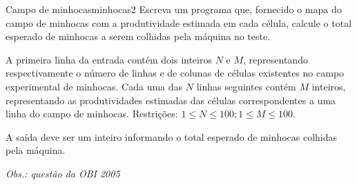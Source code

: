 \documentclass[12pt,a4paper,oneside]{article}
\begin{document}
\begin{problem}{Campo de minhocas}{minhocas}{2}
Escreva um programa que, fornecido o mapa do campo de minhocas
com a produtividade
estimada em cada célula,
calcule o %
total esperado
de minhocas a serem colhidas pela máquina %
no teste.

%

\InputFile

A primeira linha da entrada contém dois %
inteiros $N$ e $M$, representando respectivamente o número de linhas e %
de colunas de células existentes no campo experimental de minhocas. Cada uma das $N$ linhas seguintes contém $M$ inteiros, representando as produtividades estimadas das células correspondentes a uma linha do campo de minhocas.
Restrições: $1 \leq N \leq 100; 1 \leq M \leq 100$.

\OutputFile

A saída deve ser um inteiro informando o total esperado de minhocas colhidas pela máquina.


\Example

\begin{example}
%
\end{example}

\begin{example}
%
\end{example}

\small \textit{Obs.: questão da OBI 2005} 


\end{problem}
\end{document}
